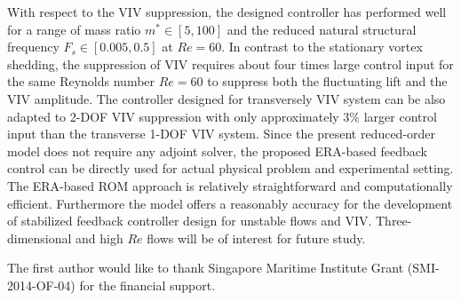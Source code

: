 \documentclass[standard]{jfm}
\begin{document}
With respect to the VIV suppression, the designed controller has performed 
well for a range of mass ratio $m^* \in [5,100]$  and 
the reduced natural structural frequency $F_s \in [0.005,0.5]$ at $Re=60$.
In contrast to the stationary vortex shedding, the suppression of VIV requires 
about four times large control input for the same Reynolds number $Re=60$ 
to suppress both the fluctuating lift and the VIV amplitude. 
The controller designed for transversely VIV 
system can be also adapted to 2-DOF VIV suppression 
with only approximately $3 \%$ larger control input than
the transverse 1-DOF VIV system. 
%
Since the present reduced-order model does not require any adjoint solver, 
the proposed ERA-based feedback control can be directly used for actual 
physical problem and experimental setting.
The ERA-based ROM approach is relatively straightforward and computationally efficient.
Furthermore the model offers a reasonably accuracy for the development of stabilized feedback controller design for unstable flows and VIV.
Three-dimensional and high $Re$ flows will be of interest for future study.

The first author would like to thank Singapore Maritime Institute Grant (SMI-2014-OF-04) 
for the financial support.


\end{document}
